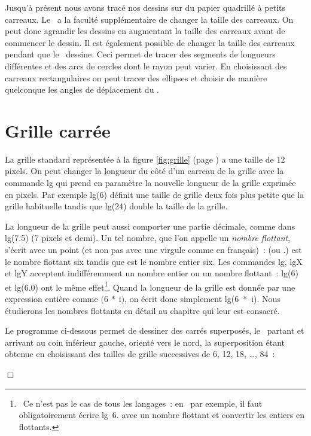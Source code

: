 Jusqu'à présent nous avons tracé nos dessins sur du papier quadrillé à petits carreaux.
Le \robot\ a la faculté supplémentaire de changer la taille des carreaux. 
On peut donc agrandir les dessins en augmentant la taille des carreaux avant de commencer le dessin. Il est également possible 
de changer la taille des carreaux pendant que le \robot\ dessine. Ceci permet de
tracer des segments de longueurs différentes et des arcs de cercles dont le rayon peut varier. 
En choisissant des carreaux rectangulaires on peut tracer des ellipses et choisir
de manière quelconque les angles de déplacement du \robot.

\section{Grille carrée}
La grille standard représentée à la figure \ref{fig:grille} (page \pageref{fig:grille})
a une taille de 12 pixels. On peut changer la 
\underline{l}ongueur du côté d'un carreau de la \underline{g}rille avec la commande {\idt lg} qui
prend en paramètre la nouvelle longueur de la grille exprimée en pixels. Par exemple
{\idt lg(6)} définit une taille de grille deux fois plus petite que la grille habituelle tandis que 
{\idt lg(24)} double la taille de la grille.

La longueur de la grille peut aussi
comporter une partie décimale, comme dans {\idt lg(7.5)} (7 pixels et demi). Un tel
nombre, que l'on appelle un {\em nombre flottant}, s'écrit avec un point
(et non pas avec une virgule comme en français)~:
{} (ou {.}) est le nombre flottant six
tandis que {} est le nombre entier six. Les commandes {\idt lg}, {\idt lgX} et {\idt lgY}
acceptent indifféremment un nombre entier ou un nombre flottant~: {\idt lg(6)} et {\idt lg(6.0)}
ont le même effet\footnote{\ Ce n'est pas le cas de tous les langages~: en \ocaml\ par exemple,
il faut obligatoirement écrire {\idt lg\ 6.} avec un nombre flottant et convertir les entiers
en flottants.}.
Quand la longueur de la grille est donnée par une expression entière comme 
$(6\ \ast\ ${\idt i}$)$, on écrit donc simplement {\idt lg(6\ $\ast$\ i)}. Nous étudierons
les nombres flottants en détail au chapitre qui leur est consacré.

\begin{exemple}{\rm
 Le programme ci-dessous permet de des\-si\-ner des carrés superposés, le \robot\ partant
 et arrivant au coin inférieur gauche, orienté vers le nord, la superposition étant
 obtenue en choisissant des tailles de grille successives de 6, 12, 18, \ldots, 84~:
 
 
\noindent $\Box$ }\end{exemple}


